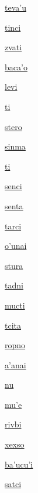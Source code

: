 {\hyperlink{val:tevahu}{teva'u}}{}{}{}

{\hyperlink{val:tinci}{tinci}}{}{}{}

{\hyperlink{val:zvati}{zvati}}{}{}{}

{\hyperlink{val:bacaho}{baca'o}}{}{}{}

{\hyperlink{val:levi}{levi}}{}{}{}

{\hyperlink{val:ti}{ti}}{}{}{}

{\hyperlink{val:stero}{stero}}{}{}{}

{\hyperlink{val:sinma}{sinma}}{}{}{}

{\hyperlink{val:ti}{ti}}{}{}{}

{\hyperlink{val:senci}{senci}}{}{}{}

{\hyperlink{val:senta}{senta}}{}{}{}

{\hyperlink{val:tarci}{tarci}}{}{}{}

{\hyperlink{val:ohunai}{o'unai}}{}{}{}

{\hyperlink{val:stura}{stura}}{}{}{}

{\hyperlink{val:tadni}{tadni}}{}{}{}

{\hyperlink{val:mucti}{mucti}}{}{}{}

{\hyperlink{val:tcita}{tcita}}{}{}{}

{\hyperlink{val:ropno}{ropno}}{}{}{}

{\hyperlink{val:ahanai}{a'anai}}{}{}{}

{\hyperlink{val:nu}{nu}}{}{}{}

{\hyperlink{val:muhe}{mu'e}}{}{}{}

{\hyperlink{val:rivbi}{rivbi}}{}{}{}

{\hyperlink{val:xexso}{xexso}}{}{}{}

{\hyperlink{val:bahucuhi}{ba'ucu'i}}{}{}{}

{\hyperlink{val:satci}{satci}}{}{}{}

